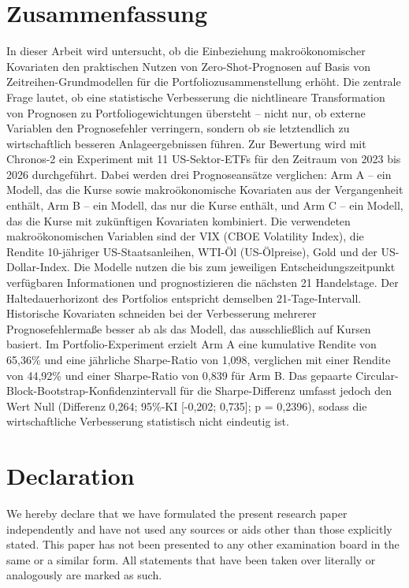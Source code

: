 \documentclass[12pt,a4paper,twoside,openany]{book}
\begin{document}
\chapter*{Zusammenfassung}
In dieser Arbeit wird untersucht, ob die Einbeziehung makroökonomischer Kovariaten den praktischen Nutzen von Zero-Shot-Prognosen auf Basis von Zeitreihen-Grundmodellen für die Portfoliozusammenstellung erhöht. Die zentrale Frage lautet, ob eine statistische Verbesserung die nichtlineare Transformation von Prognosen zu Portfoliogewichtungen übersteht – nicht nur, ob externe Variablen den Prognosefehler verringern, sondern ob sie letztendlich zu wirtschaftlich besseren Anlageergebnissen führen. Zur Bewertung wird mit Chronos-2 ein Experiment mit 11 US-Sektor-ETFs für den Zeitraum von 2023 bis 2026 durchgeführt. Dabei werden drei Prognoseansätze verglichen: Arm A – ein Modell, das die Kurse sowie makroökonomische Kovariaten aus der Vergangenheit enthält, Arm B – ein Modell, das nur die Kurse enthält, und Arm C – ein Modell, das die Kurse mit zukünftigen Kovariaten kombiniert. Die verwendeten makroökonomischen Variablen sind der VIX (CBOE Volatility Index), die Rendite 10-jähriger US-Staatsanleihen, WTI-Öl (US-Ölpreise), Gold und der US-Dollar-Index. Die Modelle nutzen die bis zum jeweiligen Entscheidungszeitpunkt verfügbaren Informationen und prognostizieren die nächsten 21 Handelstage. Der Haltedauerhorizont des Portfolios entspricht demselben 21-Tage-Intervall. Historische Kovariaten schneiden bei der Verbesserung mehrerer Prognosefehlermaße besser ab als das Modell, das ausschließlich auf Kursen basiert. Im Portfolio-Experiment erzielt Arm A eine kumulative Rendite von 65,36\% und eine jährliche Sharpe-Ratio von 1,098, verglichen mit einer Rendite von 44,92\% und einer Sharpe-Ratio von 0,839 für Arm B. Das gepaarte Circular-Block-Bootstrap-Konfidenzintervall für die Sharpe-Differenz umfasst jedoch den Wert Null (Differenz 0,264; 95\%-KI [-0,202; 0,735]; p = 0,2396), sodass die wirtschaftliche Verbesserung statistisch nicht eindeutig ist.

\chapter*{Declaration}
We hereby declare that we have formulated the present research paper independently and have not used any sources or aids other than those explicitly stated. This paper has not been presented to any other examination board in the same or a similar form. All statements that have been taken over literally or analogously are marked as such.
\end{document}
